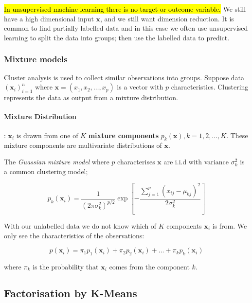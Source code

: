 \documentclass[11pt]{article}
\begin{document}
\hl{In unsupervised machine learning there is no target or outcome variable.} We still have a high dimensional input $\mathbf{x}$, and we still want dimension reduction. It is common to find partially labelled data and in this case we often use unsupervised learning to split the data into groups; then use the labelled data to predict.

\subsubsection{Mixture models}

Cluster analysis is used to collect similar observations into groups. Suppose data $(\mathbf{x}_i)_{i=1}^n$ where $\mathbf{x} = (x_1, x_2, \ldots, x_p)$ is a vector with $p$ characteristics. Clustering represents the data as output from a mixture distribution.

\paragraph{Mixture Distribution}: $\mathbf{x}_i$ is drawn from one of $K$ \textbf{mixture components} $p_k(\mathbf{x}), k = 1, 2, \ldots, K$. These mixture components are multivariate distributions of $\mathbf{x}$. 

The \textit{Guassian mixture model} where $p$ characterises $\mathbf{x}$ are i.i.d with variance $\sigma_k^2$ is a common clustering model;

\begin{equation}
    p_k(\mathbf{x}_i) = \dfrac{1}{(2\pi\sigma_k^2)^{p/2}}\exp\left[-\dfrac{\sum_{j=1}^p (x_{ij}-\mu_{kj})^2}{2\sigma_k^2}\right]
\end{equation}

With our unlabelled data we do not know which of $K$ components $\mathbf{x}_i$ is from. We only see the characteristics of the observations:

\begin{equation*}
    p(\mathbf{x}_i) = \pi_1 p_1(\mathbf{x}_i) + \pi_2 p_2 (\mathbf{x}_i) + \ldots + \pi_k p_k (\mathbf{x}_i)
\end{equation*}

where $\pi_k$ is the probability that $\mathbf{x}_i$ comes from the component $k$.

\subsection{Factorisation by K-Means}
\end{document}
